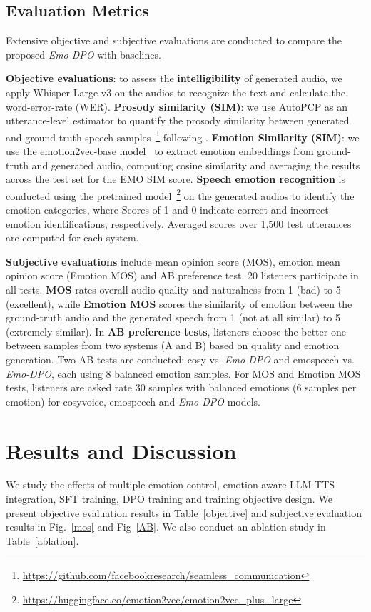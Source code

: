 \subsection{Evaluation Metrics}
\vspace{-0.2cm}
Extensive objective and subjective evaluations are conducted to compare the proposed \textit{Emo-DPO} with baselines.

\textbf{Objective evaluations}: to assess the \textbf{intelligibility} of generated audio, we apply Whisper-Large-v3 on the audios to recognize the text and calculate the word-error-rate (WER).
\textbf{Prosody similarity (SIM)}: we use AutoPCP \cite{seamless2023} as an utterance-level estimator to quantify the prosody similarity between generated and ground-truth speech samples~\footnote{\url{https://github.com/facebookresearch/seamless_communication}} following \cite{wu2024laugh}.
\textbf{Emotion Similarity (SIM)}: we use the emotion2vec-base model~\cite{ma2023emotion2vec} to extract emotion embeddings from ground-truth and generated audio, computing cosine similarity and averaging the results across the test set for the EMO SIM score. \textbf{Speech emotion recognition} is conducted using the pretrained model~\footnote{\url{ https://huggingface.co/emotion2vec/emotion2vec_plus_large}} on the generated audios to identify the emotion categories, where Scores of 1 and 0 indicate correct and incorrect emotion identifications, respectively. Averaged scores over 1,500 test utterances are computed for each system.

\textbf{Subjective evaluations} include mean opinion score (MOS), emotion mean opinion score (Emotion MOS) and AB preference test. 20 listeners participate in all tests. \textbf{MOS} rates overall audio quality and naturalness from 1 (bad) to 5 (excellent), while \textbf{Emotion MOS} scores the similarity of emotion between the ground-truth audio and the generated speech from 1 (not at all similar) to 5 (extremely similar). In \textbf{AB preference tests}, listeners choose the better one between samples from two systems (A and B) based on quality and emotion generation.  Two AB tests are conducted: cosy vs. \textit{Emo-DPO} and emospeech vs. \textit{Emo-DPO}, each using 8 balanced emotion samples. For MOS and Emotion MOS tests, listeners are asked rate 30 samples with balanced emotions (6 samples per emotion) for cosyvoice, emospeech and \textit{Emo-DPO} models.

\vspace{-0.1cm}
\section{Results and Discussion}
\vspace{-0.1cm}
We study the effects of multiple emotion control, emotion-aware LLM-TTS integration, SFT training, DPO training and training objective design. We present objective evaluation results in Table~\ref{objective} and subjective evaluation results in Fig.~\ref{mos} and Fig~\ref{AB}. We also conduct an ablation study in Table~\ref{ablation}.

